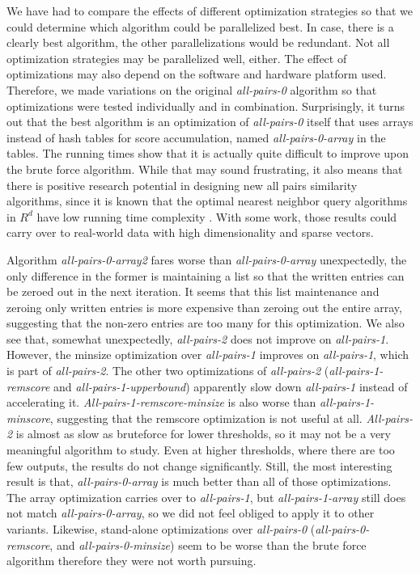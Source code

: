 \documentclass{comjnl}
\newcommand{\var}[1]{\mbox{\textsl{#1}}} %
\begin{document}
We have had to compare the effects of different optimization
strategies so that we could determine which algorithm could be
parallelized best. In case, there is a clearly best algorithm, the
other parallelizations would be redundant. Not all optimization
strategies may be parallelized well, either. The effect of
optimizations may also depend on the software and hardware platform
used. Therefore, we made variations on the original \var{all-pairs-0}
algorithm so that optimizations were tested individually and in
combination. Surprisingly, it turns out that the best algorithm is an
optimization of \var{all-pairs-0} itself that uses arrays instead of hash
tables for score accumulation, named \var{all-pairs-0-array} in the tables.
The running times show that it is actually quite difficult to improve
upon the brute force algorithm. While that may sound frustrating, it
also means that there is positive research potential in designing new
all pairs similarity algorithms, since it is known that the optimal
nearest neighbor query algorithms in $R^d$ have low running time
complexity \cite{callahan1995}. With some work, those results could
carry over to real-world data with high dimensionality and sparse
vectors.

Algorithm \var{all-pairs-0-array2} fares worse than \var{all-pairs-0-array}
unexpectedly, the only difference in the former is maintaining a list
so that the written entries can be zeroed out in the next
iteration. It seems that this list maintenance and zeroing only
written entries is more expensive than zeroing out the entire array,
suggesting that the non-zero entries are too many for this
optimization. We also see that, somewhat unexpectedly, \var{all-pairs-2}
does not improve on \var{all-pairs-1}. However, the minsize optimization
over \var{all-pairs-1} improves on \var{all-pairs-1}, which is part of
\var{all-pairs-2}. The other two optimizations of \var{all-pairs-2}
(\var{all-pairs-1-remscore} and \var{all-pairs-1-upperbound}) apparently slow down
\var{all-pairs-1} instead of accelerating it. \var{All-pairs-1-remscore-minsize}
is also worse than \var{all-pairs-1-minscore}, suggesting that the remscore
optimization is not useful at all. \var{All-pairs-2} is almost as slow as
bruteforce for lower thresholds, so it may not be a very meaningful
algorithm to study. Even at higher thresholds, where there are too few
outputs, the results do not change significantly.  Still, the most
interesting result is that, \var{all-pairs-0-array} is much better than all
of those optimizations. The array optimization carries over to
\var{all-pairs-1}, but \var{all-pairs-1-array} still does not match
\var{all-pairs-0-array}, so we did not feel obliged to apply it to
other variants. Likewise, stand-alone optimizations over \var{all-pairs-0}
(\var{all-pairs-0-remscore}, and \var{all-pairs-0-minsize}) seem to be worse than
the brute force algorithm therefore they were not worth pursuing.
\end{document}
